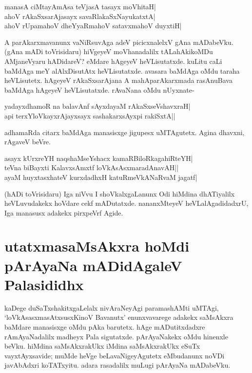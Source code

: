 \begin{shloka} 
manasA ciMtayAmAsa teVjasA tasayx moVhitaH|\label{192}\\ 
ahoV rAkaSxsarAjasayx savaRlakaSxNayukatxtA|\\ 
ahoV rUpamahoV dheYyaRmahoV satavxmahoV duyxtiH|
\end{shloka}

A parAkarxmavanunx vaNiRsuvAga adeV picicxnalelxV gAna mADabeVku. (gAna mADi toVrisidaru) hiVgeyeV moVhanadalilx tALahAkikoMDu AMjaneVyaru hADidareV? eMdare hAgeyeV heVLisutatxde. kuLitu caLi baMdAga meY alAlxDisutAtx heVLisutatxde. avasara baMdAga oMdu taraha heVLisutetx. hAgeyeV rAkaSxsarAjana A mahAparAkarxmada rasAnuBava baMdAga hAgeyeV heVLisutatxde. rAvaNana oMdu nUyxnate- 

\begin{shloka}
yadayxdhamoR na balavAnf sAyxdayaM rAkaSxseVshavxraH|\label{192b}\\ 
api terxYloVkayxrAjayxsayx sashakarxsAyxpi rakiSxtA||
\end{shloka}

adhamaRda citarx baMdAga manasisxge jigupesx uMTAgutetx. Agina dhavxni, rAgaveV beVre. 

\begin{shloka}
asayx kUrxreYH naqshaMseYshacx\label{192a} kamaRBiloRkagahiRteYH|\\ 
teVna biBayxti KalavxsAmxtf loVkAsAsxmaradAnavAH||\\ 
ayaM huyxtasxhateV kurxdadhxH katuRmeVkANaRvaM jagatf|
\end{shloka}


(hADi toVrisidaru) Iga niVvu I shoVkalxgaLanunx Odi hiMdina dhATiyalilx heVLuvudakekx hoVdare cekf mADutatxde. nananxMteyeV heVLalAgadidadxrU, Iga manasusx adakekx pirxpeVrf Agide. 

\section*{utatxmasaMsAkxra hoMdi pArAyaNa mADidAgaleV Palasididhx} 

kaDege duSaTxshakitxgaLelalx nivAraNeyAgi paramashAMti uMTAgi, `loVkAsasxmasAtxsusxKinoV Bavanutx' enunxvavarege adakekx saMsAkxra baMdare manasisxge oMdu pAka barutetx. hAge mADutitxdadxre rAmAyaNadalilx madheyx Pala sigutatxde. pArAyaNakekx oMdu hinenxle beVku. hiMdina saMsAkxrakUkx iMdina saMsAkxrakUkx eSuTx vayxtAyxsavide; muMde heVge beLavaNigeyAgutetx eMbudanunx noVDi javAbAdxri koTATxyitu. adara rasadalilx muLugi pArAyaNa mADabeVku. 

